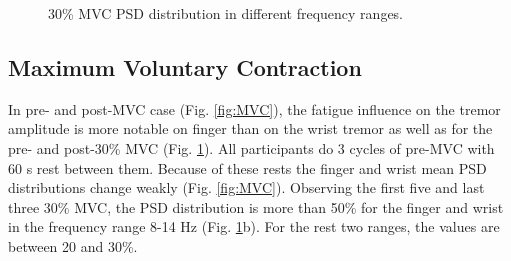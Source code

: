 \documentclass[conference, a4paper]{IEEEtran}
\begin{document}
\begin{figure}[h!]
	\centering
	\label{fig:finger_PC_30MVC}
	\hfill
	\label{fig:finger_RC_30MVC}
	\hfill
	\label{fig:finger_LPC_30MVC}
	\caption{30\% MVC PSD distribution in different frequency ranges.}
	\label{fig:30_MVC}
\end{figure}
%
%


\subsection{Maximum Voluntary Contraction}

In pre- and post-MVC case (Fig. \ref{fig:MVC}), the fatigue influence on the tremor amplitude is more notable on finger than on the wrist tremor as well as for the pre- and post-30\% MVC (Fig. \ref{fig:30_MVC}).
All participants do 3 cycles of pre-MVC with 60 s rest between them. Because of these rests the finger and wrist mean PSD distributions change weakly (Fig. \ref{fig:MVC}).
Observing the first five and last three 30\% MVC, the PSD distribution is more than 50\% for the finger and wrist in the frequency range 8-14 Hz (Fig. \ref{fig:30_MVC}b). For the rest two ranges, the values are between 20 and 30\%.
\end{document}
